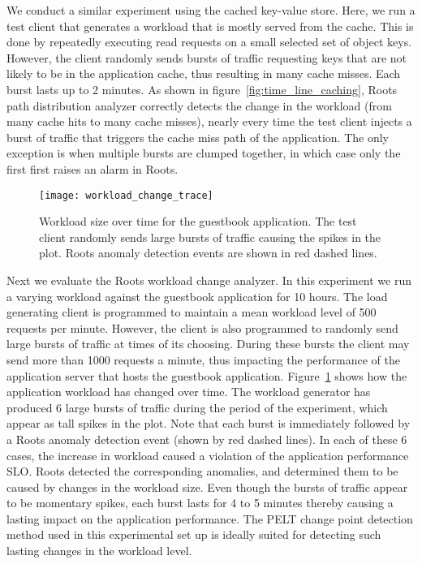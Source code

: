 We conduct a similar experiment using the cached key-value store. Here, we run a test client that generates a workload
that is mostly served from the cache. This is done by repeatedly executing read requests on a small
selected set of object keys. However, the client randomly sends bursts of traffic requesting keys that
are not likely to be in the application cache, thus resulting in many cache misses. Each burst
lasts up to 2 minutes. As shown in 
figure~\ref{fig:time_line_caching}, Roots path distribution analyzer correctly detects the change 
in the workload (from many cache hits to many cache misses), nearly every time the test client injects a 
burst of traffic that triggers the cache miss path of the application. The only exception is when
multiple bursts are clumped together, in which case only the first first raises an alarm in Roots.

\begin{figure}
\centering
\texttt{[image: workload\_change\_trace]}
\caption{Workload size over time for the guestbook application. The test client randomly sends
large bursts of traffic causing the spikes in the plot. Roots anomaly detection events are shown
in red dashed lines.}
\label{fig:workload_change}
\end{figure}

Next we evaluate the Roots workload change analyzer. In this experiment we run a varying workload
against the guestbook application for 10 hours. The load generating client is programmed
to maintain a mean workload level of 500 requests per minute. However, the client
is also programmed to randomly send large bursts of traffic at times of its choosing. During these bursts 
the client may send more than 1000 requests a minute, thus impacting the performance of
the application server that hosts the guestbook application. Figure~\ref{fig:workload_change} shows how
the application workload has changed over time. The workload generator has produced 6 large bursts of traffic during the 
period of the experiment, which appear as tall spikes in the plot.
Note that each burst is immediately followed by a Roots anomaly detection event (shown by red dashed lines). 
In each of these 6 cases, the increase in workload caused a violation of the application performance SLO.
Roots detected the corresponding anomalies, and determined them to be caused by changes in the workload size.
Even though the bursts of traffic appear to be momentary
spikes, each burst lasts for 4 to 5 minutes thereby causing a lasting impact on the application performance.
The PELT change point detection method used in this experimental set up is ideally suited for detecting
such lasting changes in the workload level.

